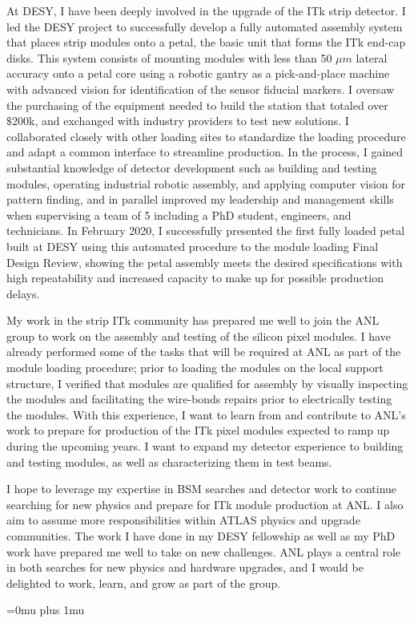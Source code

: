 \documentclass[a4paper]{article}
\begin{document}
At DESY, I have been deeply involved in the upgrade of the ITk strip detector\cite{ITKstrips}.
I led the DESY project to successfully develop a fully automated assembly system that places strip modules onto a petal, the basic unit that forms the ITk end-cap disks.
This system consists of mounting modules with less than 50 $\mu m$ lateral accuracy onto a petal core using a robotic gantry as a pick-and-place machine with advanced vision for identification of the sensor fiducial markers. I oversaw the purchasing of the equipment needed to build the station that totaled over $\$200$k, and exchanged with industry providers to test new solutions. I collaborated closely with other loading sites to standardize the loading procedure and adapt a common interface to streamline production.
In the process, I gained substantial knowledge of detector development such as building and testing modules, operating industrial robotic assembly, and applying computer vision for pattern finding, and in parallel improved my leadership and management skills when supervising a team of 5 including a PhD student, engineers, and technicians. In February 2020, I successfully presented the first fully loaded petal built at DESY using this automated procedure to the module loading Final Design Review, showing the petal assembly meets the desired specifications with high repeatability and increased capacity to make up for possible production delays.

My work in the strip ITk community has prepared me well to join the ANL group to work on the assembly and testing of the silicon pixel modules.
I have already performed some of the tasks that will be required at ANL as part of the module loading procedure; prior to loading the modules on the local support structure, I verified that modules are qualified for assembly by visually inspecting the modules and
facilitating the wire-bonds repairs prior to electrically testing the modules.
With this experience, I want to learn from and contribute to ANL's work to prepare for production of the ITk pixel modules expected to ramp up during the upcoming years. I want to expand my detector experience to building and testing modules, as well as characterizing them in test beams.



I hope to leverage my expertise in BSM searches and detector work to continue searching for new physics and prepare for ITk
module production at ANL. I also aim to assume more responsibilities within ATLAS physics and upgrade communities. The work I have done
in my DESY fellowship as well as my PhD work have prepared me well to take on new challenges.
ANL plays a central role in both searches for new physics and hardware upgrades, and I would be delighted to work,
learn, and grow as part of the group.




\Urlmuskip=0mu plus 1mu\relax
{%
\fontsize{11}{14}
\selectfont
}{}

\end{document}
